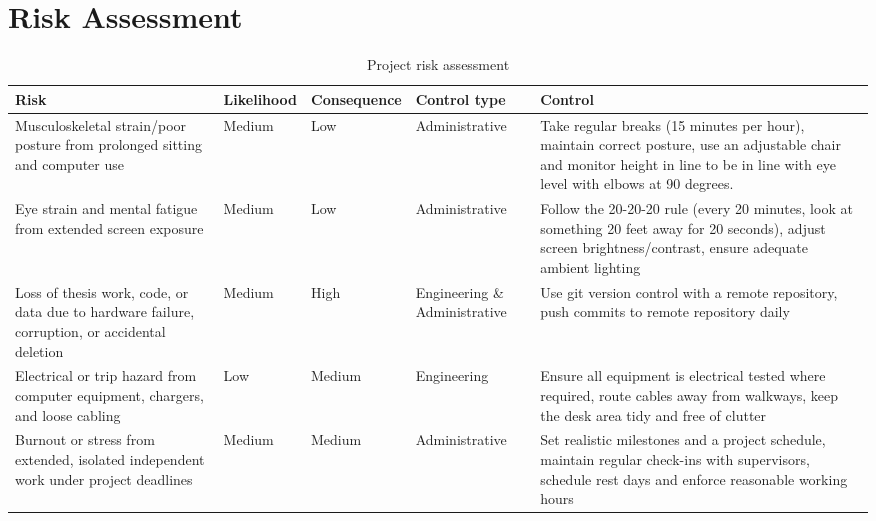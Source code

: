 \documentclass[11pt, a4paper]{article}
\begin{document}
	\section{Risk Assessment}\label{apn:RA}
	\begin{table}[h!]
		\begin{tabularx}{\textwidth}{|X|X|X|X|X|}\hline
			Risk & Likelihood & Consequence & Control type & Control \\\hline
			Musculoskeletal strain/poor posture from prolonged sitting and computer use & Medium & Low & Administrative & Take regular breaks (15 minutes per hour), maintain correct posture, use an adjustable chair and monitor height in line to be in line with eye level with elbows at 90 degrees. \\\hline
			Eye strain and mental fatigue from extended screen exposure & Medium & Low & Administrative & Follow the 20-20-20 rule (every 20 minutes, look at something 20 feet away for 20 seconds), adjust screen brightness/contrast, ensure adequate ambient lighting \\\hline
			Loss of thesis work, code, or data due to hardware failure, corruption, or accidental deletion & Medium & High & Engineering \& Administrative & Use git version control with a remote repository, push commits to remote repository daily \\\hline
			Electrical or trip hazard from computer equipment, chargers, and loose cabling & Low & Medium & Engineering & Ensure all equipment is electrical tested where required, route cables away from walkways, keep the desk area tidy and free of clutter \\\hline
			Burnout or stress from extended, isolated independent work under project deadlines & Medium & Medium & Administrative & Set realistic milestones and a project schedule, maintain regular check-ins with supervisors, schedule rest days and enforce reasonable working hours \\\hline
		\end{tabularx}	
		\caption{Project risk assessment}
	\end{table}
	\newpage
    \printbibliography
\end{document}
